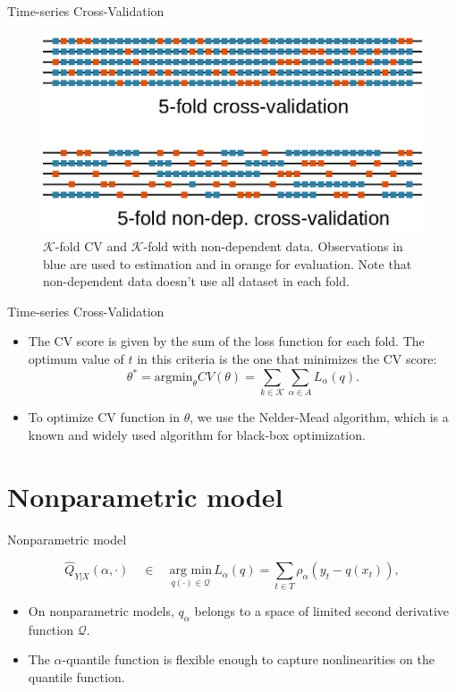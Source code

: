 \begin{frame}{Time-series Cross-Validation}

\begin{figure}
    \centering
    \includegraphics[width=0.9\linewidth]{Imagens/Cross-validation-scheme}
    \caption{$\mathcal{K}$-fold CV and $\mathcal{K}$-fold with non-dependent data. Observations in blue are used to estimation and in orange for evaluation. Note that non-dependent data doesn't use all dataset in each fold.}
    \label{fig:cross-validation-scheme}
\end{figure}

\end{frame}

\begin{frame}{Time-series Cross-Validation}

\begin{itemize}
\tightlist
\item
  The CV score is given by the sum of the loss function for each fold.
  The optimum value of \(t\) in this criteria is the one that minimizes
  the CV score: \[
  \theta^* = \text{argmin}_\theta CV(\theta) = \sum_{k \in \mathcal{K}} \sum_{\alpha \in A} L_\alpha(q).
  \]
\item
  To optimize CV function in \(\theta\), we use the Nelder-Mead
  algorithm, which is a known and widely used algorithm for black-box
  optimization.
\end{itemize}

\end{frame}

\section{Nonparametric model}\label{nonparametric-model}

\begin{frame}{Nonparametric model}

\[
\hat{Q}_{Y|X}(\alpha,\cdot)\quad\in\quad  \underset{q(\cdot)\in\mathcal{Q}}{\text{arg min}}\, L_\alpha(q) = \sum_{t\in T}\rho_{\alpha}(y_{t}-q(x_t)),
\]

\begin{itemize}
\item
  On nonparametric models, \(q_\alpha\) belongs to a space of limited
  second derivative function \(\mathcal{Q}\).
\item
  The \(\alpha\)-quantile function is flexible enough to capture
  nonlinearities on the quantile function.
\end{itemize}

\end{frame}

